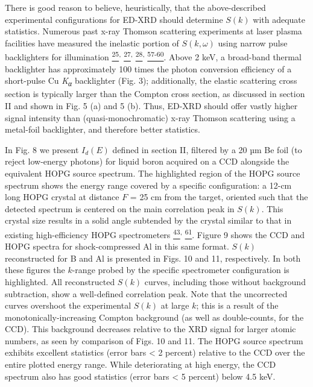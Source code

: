 There is good reason to believe, heuristically, that the above-described
experimental configurations for ED-XRD should determine
\(S\left( k \right)\) with adequate statistics. Numerous past x-ray
Thomson scattering experiments at laser plasma facilities have measured
the inelastic portion of \(S\left( k,\omega \right)\) using narrow pulse
backlighters for illumination
\hyperref[s.-h.-glenzer-and-r.-redmer-reviews-of-modern-physics-81-1625-2009.]{\textsuperscript{25}}\textsuperscript{,}
\hyperref[h.-j.-lee-et-al.-physical-review-letters-102-115001-2009.]{\textsuperscript{27}}\textsuperscript{,}
\hyperref[c.-fortmann-h.-j.-lee-t.-doeppner-r.-w.-falcone-a.-l.-kritcher-o.-l.-landen-and-s.-h.-glenzer-physical-review-letters-108-175006-2012.]{\textsuperscript{28}}\textsuperscript{,}
\hyperref[r.-tommasini-et-al.-review-of-scientific-instruments-79-10e901-2008.]{\textsuperscript{57-60}}.
Above 2 keV, a broad-band thermal backlighter has approximately 100
times the photon conversion efficiency of a short-pulse Cu
\emph{K\textsubscript{α}} backlighter (Fig. 3); additionally, the
elastic scattering cross section is typically larger than the Compton
cross section, as discussed in section II and shown in Fig. 5 (a) and 5
(b). Thus, ED-XRD should offer vastly higher signal intensity than
(quasi-monochromatic) x-ray Thomson scattering using a metal-foil
backlighter, and therefore better statistics.

In Fig. 8 we present \(I_{d}\left( E \right)\) defined in section II,
filtered by a 20 µm Be foil (to reject low-energy photons) for liquid
boron acquired on a CCD alongside the equivalent HOPG source spectrum.
The highlighted region of the HOPG source spectrum shows the energy
range covered by a specific configuration: a 12-cm long HOPG crystal at
distance \(F\) = 25 cm from the target, oriented such that the detected
spectrum is centered on the main correlation peak in \(S(k)\). This
crystal size results in a solid angle subtended by the crystal similar
to that in existing high-efficiency HOPG spectrometers
\hyperref[b.-yaakobi-2012-private-communication.]{\textsuperscript{43}}\textsuperscript{,}
\hyperref[a.-pak-g.-gregori-j.-knight-k.-campbell-d.-price-b.-hammel-o.-l.-landen-and-s.-h.-glenzer-review-of-scientific-instruments-75-3747-2004.]{\textsuperscript{61}}.
Figure 9 shows the CCD and HOPG spectra for shock-compressed Al in this
same format. \(S\left( k \right)\) reconstructed for B and Al is
presented in Figs. 10 and 11, respectively. In both these figures the
\(k\)-range probed by the specific spectrometer configuration is
highlighted. All reconstructed \(S\left( k \right)\) curves, including
those without background subtraction, show a well-defined correlation
peak. Note that the uncorrected curves overshoot the experimental
\(S\left( k \right)\) at large \(k\); this is a result of the
monotonically-increasing Compton background (as well as double-counts,
for the CCD). This background decreases relative to the XRD signal for
larger atomic numbers, as seen by comparison of Figs. 10 and 11. The
HOPG source spectrum exhibits excellent statistics (error bars
\textless{} 2 percent) relative to the CCD over the entire plotted
energy range. While deteriorating at high energy, the CCD spectrum also
has good statistics (error bars \textless{} 5 percent) below 4.5 keV.

